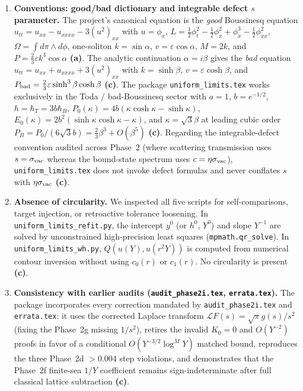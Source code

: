 \documentclass[11pt,a4paper]{article}
\newcommand{\A}{\textbf{(a)}}
\newcommand{\C}{\textbf{(c)}}
\newcommand{\scr}[1]{\texttt{#1}}
\begin{document}
\begin{enumerate}
\item \textbf{Conventions: good/bad dictionary and integrable defect $s$ parameter.}
The project's canonical equation is the \emph{good} Boussinesq equation
$u_{tt}=u_{xx}-u_{xxxx}-3(u^2)_{xx}$ with $u=\phi_x$,
$L=\frac12\phi_t^2-\frac12\phi_x^2+\phi_x^3-\frac12\phi_{xx}^2$,
$\Omega=\int d\pi\wedge d\phi$, one-soliton $k=\sin\alpha$, $v=\varepsilon\cos\alpha$,
$M=2k$, and $P=\frac23\varepsilon k^3\cos\alpha$ \A. The analytic continuation
$\alpha=i\beta$ gives the \emph{bad} equation
$u_{tt}=u_{xx}+u_{xxxx}+3(u^2)_{xx}$ with $k=\sinh\beta$, $v=\varepsilon\cosh\beta$,
and $P_{\rm bad}=\frac23\varepsilon\sinh^3\beta\cosh\beta$ \C.
The package \scr{uniform\_limits.tex} works exclusively in the Toda /
bad-Boussinesq sector with $a=1$, $b=e^{-1/2}$, $h=\hbar_T=3b\hbar_B$,
$P_0(\kappa)=4b(\kappa\cosh\kappa-\sinh\kappa)$,
$E_0(\kappa)=2b^2(\sinh\kappa\cosh\kappa-\kappa)$, and $\kappa=\sqrt{3}\beta$ at
leading cubic order $P_B=P_0/(6\sqrt{3}b)=\frac23\beta^3+O(\beta^5)$ \C.
Regarding the integrable-defect convention audited across Phase~2 (where
scattering transmission uses $s=\sigma_{\rm vac}$ whereas the bound-state
spectrum uses $c=\eta\sigma_{\rm vac}$), \scr{uniform\_limits.tex} does not invoke
defect formulas and never conflates $s$ with $\eta\sigma_{\rm vac}$ \C.

\item \textbf{Absence of circularity.}
We inspected all five scripts for self-comparisons, target injection, or
retroactive tolerance loosening. In \scr{uniform\_limits\_refit.py}, the intercept
$y^0$ (or $h^0$, $Y^0$) and slope $Y^{-1}$ are solved by unconstrained
high-precision least squares (\scr{mpmath.qr\_solve}). In
\scr{uniform\_limits\_wh.py}, $Q(u(Y),u(r^2Y))$ is computed from numerical
contour inversion without using $c_0(r)$ or $c_1(r)$. No circularity is present \C.

\item \textbf{Consistency with earlier audits (\scr{audit\_phase2i.tex}, \scr{errata.tex}).}
The package incorporates every correction mandated by \scr{audit\_phase2i.tex}
and \scr{errata.tex}: it uses the corrected Laplace transform
$\mathcal L F(s)=\sqrt{\pi}g(s)/s^2$ (fixing the Phase~2g missing $1/s^2$),
retires the invalid $K_0=0$ and $O(Y^{-2})$ proofs in favor of a conditional
$O(Y^{-3/2}\log^M Y)$ matched bound, reproduces the three Phase~2d $>0.004$ step
violations, and demonstrates that the Phase~2f finite-sea $1/Y$ coefficient
remains sign-indeterminate after full classical lattice subtraction \C.


\end{enumerate}
\end{document}
